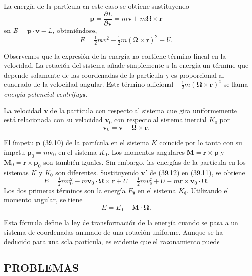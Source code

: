 \documentclass[12pt]{article}
\begin{document}
La energía de la partícula en este caso se obtiene sustituyendo
\[
\mathbf{p} = \frac{\partial L}{\partial \mathbf{v}} = m \mathbf{v} + m \mathbf{\Omega} \times \mathbf{r}
\]
en $E = \mathbf{p} \cdot \mathbf{v} - L$, obteniéndose,
\begin{equation}
E = \tfrac{1}{2} m v^2 - \tfrac{1}{2} m (\mathbf{\Omega} \times \mathbf{r})^2 + U.
\tag{39.11}
\end{equation}

Observemos que la expresión de la energía no contiene término lineal en la velocidad. La rotación del sistema añade simplemente a la energía un término que depende solamente de las coordenadas de la partícula y es proporcional al cuadrado de la velocidad angular. Este término adicional $-\tfrac{1}{2} m (\mathbf{\Omega} \times \mathbf{r})^2$ se llama \textit{energía potencial centrífuga}.

La velocidad $\mathbf{v}$ de la partícula con respecto al sistema que gira uniformemente está relacionada con su velocidad $\mathbf{v}_0$ con respecto al sistema inercial $K_0$ por
\begin{equation}
\mathbf{v}_0 = \mathbf{v} + \mathbf{\Omega} \times \mathbf{r}.
\tag{39.12}
\end{equation}

El ímpetu $\mathbf{p}$ (39.10) de la partícula en el sistema $K$ coincide por lo tanto con su ímpetu $\mathbf{p}_0 = m \mathbf{v}_0$ en el sistema $K_0$. Los momentos angulares $\mathbf{M} = \mathbf{r} \times \mathbf{p}$ y $\mathbf{M}_0 = \mathbf{r} \times \mathbf{p}_0$ son también iguales. Sin embargo, las energías de la partícula en los sistemas $K$ y $K_0$ son diferentes. Sustituyendo $\mathbf{v'}$ de (39.12) en (39.11), se obtiene
\[
E = \tfrac{1}{2} m v_0^2 - m \mathbf{v}_0 \cdot \mathbf{\Omega} \times \mathbf{r} + U = \tfrac{1}{2} m v_0^2 + U - m \mathbf{r} \times \mathbf{v}_0 \cdot \mathbf{\Omega}.
\]
Los dos primeros términos son la energía $E_0$ en el sistema $K_0$. Utilizando el momento angular, se tiene
\begin{equation}
E = E_0 - \mathbf{M} \cdot \mathbf{\Omega}.
\tag{39.13}
\end{equation}

Esta fórmula define la ley de transformación de la energía cuando se pasa a un sistema de coordenadas animado de una rotación uniforme. Aunque se ha deducido para una sola partícula, es evidente que el razonamiento puede

\subsection*{PROBLEMAS}
\end{document}
